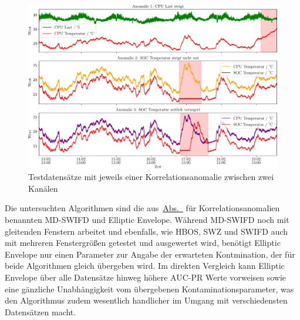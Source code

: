 \begin{figure}[t!]
    \centering
     \includegraphics[width=1\linewidth]{ch5_anomalieerkennung/abbildungen/korrealtionsanomalien_daten.pdf}
    \caption{Testdatensätze mit jeweils einer Korrelationsanomalie zwischen zwei Kanälen}
    \label{fig:korrelationsanomalie_datensätze}
\end{figure}

Die untersuchten Algorithmen sind die aus~\hyperref[sec:algorithmen]{Abs.~} für Korrelationsanomalien benannten MD-SWIFD und Elliptic
Envelope. Während MD-SWIFD noch mit gleitenden Fenstern arbeitet und ebenfalls, wie HBOS, SWZ und SWIFD auch mit mehreren Fenstergrößen getestet und
ausgewertet wird, benötigt Elliptic Envelope nur einen Parameter zur Angabe der erwarteten Kontmination, der für beide Algorithmen gleich übergeben wird.
Im direkten Vergleich kann Elliptic Envelope über alle Datensätze hinweg höhere AUC-PR Werte vorweisen sowie eine gänzliche Unabhängigkeit vom übergebenen
Kontaminationsparameter, was den Algorithmus zudem wesentlich handlicher im Umgang mit verschiedensten Datensätzen macht.

